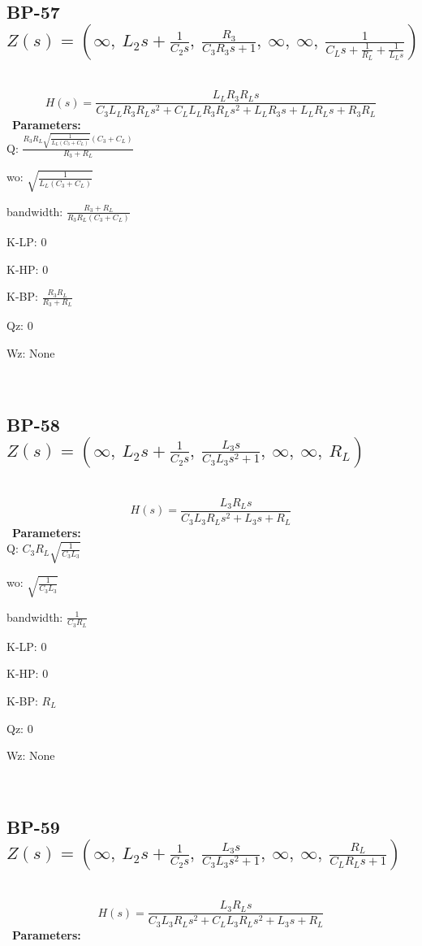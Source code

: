 \documentclass{article}
\begin{document}
\ 

\subsection{BP-57 $Z(s) = \left( \infty, \  L_{2} s + \frac{1}{C_{2} s}, \  \frac{R_{3}}{C_{3} R_{3} s + 1}, \  \infty, \  \infty, \  \frac{1}{C_{L} s + \frac{1}{R_{L}} + \frac{1}{L_{L} s}}\right)$ } \ 
\textbf{\[H(s) = \frac{L_{L} R_{3} R_{L} s}{C_{3} L_{L} R_{3} R_{L} s^{2} + C_{L} L_{L} R_{3} R_{L} s^{2} + L_{L} R_{3} s + L_{L} R_{L} s + R_{3} R_{L}}\] } \ 
\textbf{Parameters:}\\ 

Q: $\frac{R_{3} R_{L} \sqrt{\frac{1}{L_{L} \left(C_{3} + C_{L}\right)}} \left(C_{3} + C_{L}\right)}{R_{3} + R_{L}}$\ 

wo: $\sqrt{\frac{1}{L_{L} \left(C_{3} + C_{L}\right)}}$\ 

bandwidth: $\frac{R_{3} + R_{L}}{R_{3} R_{L} \left(C_{3} + C_{L}\right)}$\ 

K-LP: $0$\ 

K-HP: $0$\ 

K-BP: $\frac{R_{3} R_{L}}{R_{3} + R_{L}}$\ 

Qz: $0$\ 

Wz: $\text{None}$\ 

\ 

\subsection{BP-58 $Z(s) = \left( \infty, \  L_{2} s + \frac{1}{C_{2} s}, \  \frac{L_{3} s}{C_{3} L_{3} s^{2} + 1}, \  \infty, \  \infty, \  R_{L}\right)$ } \ 
\textbf{\[H(s) = \frac{L_{3} R_{L} s}{C_{3} L_{3} R_{L} s^{2} + L_{3} s + R_{L}}\] } \ 
\textbf{Parameters:}\\ 

Q: $C_{3} R_{L} \sqrt{\frac{1}{C_{3} L_{3}}}$\ 

wo: $\sqrt{\frac{1}{C_{3} L_{3}}}$\ 

bandwidth: $\frac{1}{C_{3} R_{L}}$\ 

K-LP: $0$\ 

K-HP: $0$\ 

K-BP: $R_{L}$\ 

Qz: $0$\ 

Wz: $\text{None}$\ 

\ 

\subsection{BP-59 $Z(s) = \left( \infty, \  L_{2} s + \frac{1}{C_{2} s}, \  \frac{L_{3} s}{C_{3} L_{3} s^{2} + 1}, \  \infty, \  \infty, \  \frac{R_{L}}{C_{L} R_{L} s + 1}\right)$ } \ 
\textbf{\[H(s) = \frac{L_{3} R_{L} s}{C_{3} L_{3} R_{L} s^{2} + C_{L} L_{3} R_{L} s^{2} + L_{3} s + R_{L}}\] } \ 
\textbf{Parameters:}\\ 
\end{document}
